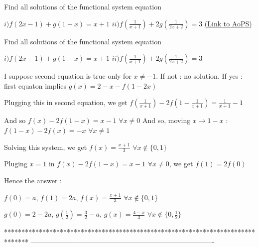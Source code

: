 \begin{problem}
	Find all solutions of the functional system equation

$i) f(2x-1)+g(1-x)=x+1$
$ii) f(\frac{1}{x+1})+2g(\frac{1}{2x+2})=3$
	\flushright \href{https://artofproblemsolving.com/community/c6h584557}{(Link to AoPS)}
\end{problem}



\begin{solution}
	\begin{tcolorbox}Find all solutions of the functional system equation

$i) f(2x-1)+g(1-x)=x+1$
$ii) f(\frac{1}{x+1})+2g(\frac{1}{2x+2})=3$\end{tcolorbox}
I suppose second equation is true only for $x\ne -1$. If not : no solution.
If yes : first equaton implies $g(x)=2-x-f(1-2x)$

Plugging this in second equation, we get $f(\frac 1{x+1})-2f(1-\frac 1{x+1})=\frac 1{x+1}-1$

And so $f(x)-2f(1-x)=x-1$ $\forall x\ne 0$
And so, moving $x\to 1-x$ : $f(1-x)-2f(x)=-x$ $\forall x\ne 1$

Solving this system, we get $f(x)=\frac{x+1}3$ $\forall x\notin\{0,1\}$

Pluging $x=1$ in $f(x)-2f(1-x)=x-1$ $\forall x\ne 0$, we get $f(1)=2f(0)$

Hence the answer :

$f(0)=a$, $f(1)=2a$, $f(x)=\frac{x+1}3$ $\forall x\notin\{0,1\}$

$g(0)=2-2a$, $g(\frac 12)=\frac 32-a$, $g(x)=\frac{4-x}3$ $\forall x\notin\{0,\frac 12\}$
\end{solution}
*******************************************************************************
-------------------------------------------------------------------------------

